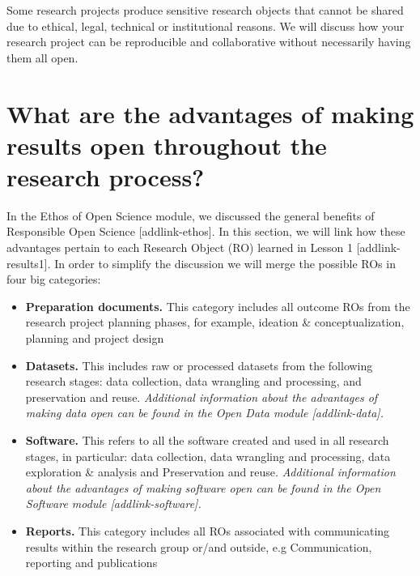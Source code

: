 \documentclass[
  letterpaper,
  DIV=11,
  numbers=noendperiod]{scrreport}
\providecommand{\tightlist}{%
  \setlength{\itemsep}{0pt}\setlength{\parskip}{0pt}}\usepackage{longtable,booktabs,array}
\begin{document}
Some research projects produce sensitive research objects that cannot be
shared due to ethical, legal, technical or institutional reasons. We
will discuss how your research project can be reproducible and
collaborative without necessarily having them all open.

\hypertarget{what-are-the-advantages-of-making-results-open-throughout-the-research-process}{%
\section{\texorpdfstring{What are the \textbf{advantages} of making
results open throughout the research
process?}{What are the advantages of making results open throughout the research process?}}\label{what-are-the-advantages-of-making-results-open-throughout-the-research-process}}

In the Ethos of Open Science module, we discussed the general benefits
of Responsible Open Science {[}addlink-ethos{]}. In this section, we
will link how these advantages pertain to each Research Object (RO)
learned in Lesson 1 {[}addlink-results1{]}. In order to simplify the
discussion we will merge the possible ROs in four big categories:

\begin{itemize}
\tightlist
\item
  \textbf{Preparation documents.} This category includes all outcome ROs
  from the research project planning phases, for example, ideation \&
  conceptualization, planning and project design
\item
  \textbf{Datasets.} This includes raw or processed datasets from the
  following research stages: data collection, data wrangling and
  processing, and preservation and reuse. \emph{Additional information
  about the advantages of making data open can be found in the Open Data
  module {[}addlink-data{]}.}
\item
  \textbf{Software.} This refers to all the software created and used in
  all research stages, in particular: data collection, data wrangling
  and processing, data exploration \& analysis and Preservation and
  reuse. \emph{Additional information about the advantages of making
  software open can be found in the Open Software module
  {[}addlink-software{]}.}
\item
  \textbf{Reports.} This category includes all ROs associated with
  communicating results within the research group or/and outside, e.g
  Communication, reporting and publications
\end{itemize}
\end{document}
